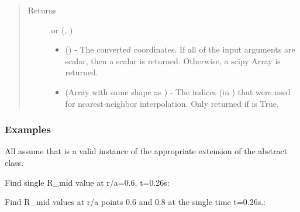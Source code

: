 \documentclass[letterpaper,10pt,english]{sphinxmanual}
\begin{document}
\begin{fulllineitems}
\begin{fulllineitems}
\begin{quote}
\begin{description}
\begin{itemize}
\end{itemize}

\item[{Returns}] \leavevmode

 or (, )
\begin{itemize}
\item {} 
 () - The converted coordinates. If
all of the input arguments are scalar, then a scalar is returned.
Otherwise, a scipy Array is returned.

\item {} 
 (Array with same shape as ) - The indices
(in ) that were used for
nearest-neighbor interpolation. Only returned if  is
True.

\end{itemize}


\end{description}\end{quote}
\subsubsection*{Examples}

All assume that  is a valid instance of the appropriate
extension of the {\hyperref[\detokenize{eqtools:eqtools.core.Equilibrium}]{}} abstract class.

Find single R\_mid value at r/a=0.6, t=0.26s:

\begin{sphinxVerbatim}[commandchars=\\\{\}]
   
\end{sphinxVerbatim}

Find R\_mid values at r/a points 0.6 and 0.8 at the
single time t=0.26s.:

\begin{sphinxVerbatim}[commandchars=\\\{\}]
  \PYG{p}{[} \PYG{p}{]} 
\end{sphinxVerbatim}


\end{fulllineitems}
\end{fulllineitems}
\end{document}
